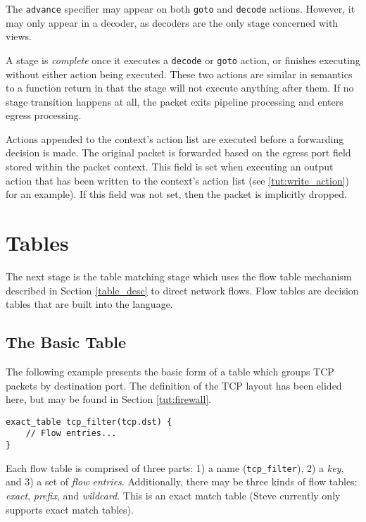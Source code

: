 The \texttt{advance} specifier may appear on both \texttt{goto} and \texttt{decode} actions. However, it may only appear in a decoder, as decoders are the only
stage concerned with views.

A stage is \textit{complete} once it executes a \texttt{decode} or \texttt{goto} action, or
finishes executing without either action being executed. 
These two actions are similar in semantics to a function return
in that the stage will not execute anything after them.
If no stage transition happens at all,
the packet exits pipeline processing and enters egress processing.

Actions appended to the context's action list are executed before a forwarding decision is made.
The original packet is forwarded based on the egress port field stored
within the packet context. This field is set when executing an
output action that has been written to the context's action list
(see \ref{tut:write_action}) for an example). If this field was not set,
then the packet is implicitly dropped.

\section{Tables} \label{tut:table}

The next stage is the table matching stage which uses the flow table mechanism described in Section \ref{table_desc} to direct network flows. Flow tables are decision tables that are built into the language.

\subsection{The Basic Table} \label{tut:basic_table}

The following example presents the basic form of a table which
groups TCP packets by destination port. The definition of the TCP
layout has been elided here, but may be found in Section \ref{tut:firewall}.

\begin{codepage}
\begin{lstlisting}
exact_table tcp_filter(tcp.dst) {
	// Flow entries...
}
\end{lstlisting}
\end{codepage}

Each flow table is comprised of three parts: 
1) a name (\texttt{tcp\_filter}), 
2) a \textit{key}, and
3) a set of \textit{flow entries}. 
Additionally, there may be three kinds of flow tables: 
\textit{exact}, \textit{prefix}, and \textit{wildcard}. 
This is an exact match table (Steve currently only supports exact
match tables).


